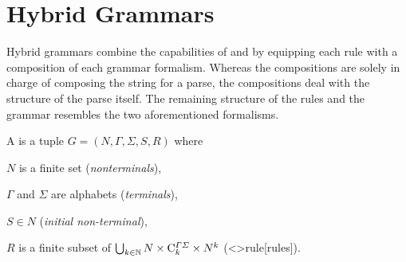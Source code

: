 \documentclass[../../document.tex]{subfiles}
\begin{document}
    \section{Hybrid Grammars}
    Hybrid grammars combine the capabilities of  and  by equipping each rule with a composition of each grammar formalism.
    Whereas the  compositions are solely in charge of composing the string for a parse, the  compositions deal with the structure of the parse itself.
    The remaining structure of the rules and the grammar resembles the two aforementioned formalisms.

    \begin{definition}
        A  is a tuple \(G = (N, \varGamma, \varSigma, S, R)\) where
        \begin{compactitem}
            \item \(N\) is a finite set (\emph{nonterminals}),
            \item \(\varGamma\) and \(\varSigma\) are alphabets (\emph{terminals}),
            \item \(S \in N\) (\emph{initial non-terminal}),
            \item \(R\) is a finite subset of \(\bigcup_{k \in \mathbb{N}} N \times \mathrm{C}^{\varGamma\varSigma}_k \times N^k\) (<\dcp>{rule}[rules]).
        \end{compactitem}
    \end{definition}
\end{document}

